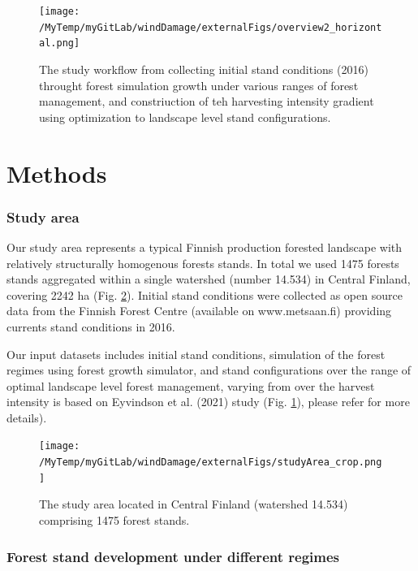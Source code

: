 \documentclass[]{elsarticle} %
\begin{document}
\begin{figure}
\centering
\texttt{[image: /MyTemp/myGitLab/windDamage/externalFigs/overview2\_horizontal.png]}
\caption{The study workflow from collecting initial stand conditions
(2016) throught forest simulation growth under various ranges of forest
management, and constriuction of teh harvesting intensity gradient using
optimization to landscape level stand configurations.\label{workflow}}
\end{figure}

\section{Methods}\label{methods}

\subsubsection{Study area}\label{study-area}

Our study area represents a typical Finnish production forested
landscape with relatively structurally homogenous forests stands. In
total we used 1475 forests stands aggregated within a single watershed
(number 14.534) in Central Finland, covering 2242 ha (Fig.
\ref{study_area}). Initial stand conditions were collected as open
source data from the Finnish Forest Centre (available on www.metsaan.fi)
providing currents stand conditions in 2016.

Our input datasets includes initial stand conditions, simulation of the
forest regimes using forest growth simulator, and stand configurations
over the range of optimal landscape level forest management, varying
from over the harvest intensity is based on Eyvindson et al. (2021)
study (Fig. \ref{workflow}), please refer for more details).

\begin{figure}
\centering
\texttt{[image: /MyTemp/myGitLab/windDamage/externalFigs/studyArea\_crop.png]}
\caption{The study area located in Central Finland (watershed 14.534)
comprising 1475 forest stands.\label{study_area}}
\end{figure}

\subsubsection{Forest stand development under different
regimes}\label{forest-stand-development-under-different-regimes}
\end{document}
